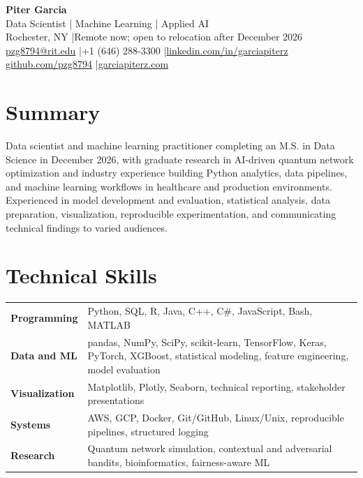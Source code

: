\documentclass[10pt,letterpaper]{article}
\begin{document}
\fontsize{9}{10.4}\selectfont

\begin{center}
  {\Large\bfseries Piter Garcia}\\[1pt]
  {\large Data Scientist | Machine Learning | Applied AI}\\[2pt]
  Rochester, NY \enspace|\enspace Remote now; open to relocation after December 2026\\
  \href{mailto:pzg8794@rit.edu}{pzg8794@rit.edu}
  \enspace|\enspace +1 (646) 288-3300
  \enspace|\enspace \href{https://linkedin.com/in/garciapiterz}{linkedin.com/in/garciapiterz}\\
  \href{https://github.com/pzg8794}{github.com/pzg8794}
  \enspace|\enspace \href{https://garciapiterz.com}{garciapiterz.com}
\end{center}

\section*{Summary}
Data scientist and machine learning practitioner completing an M.S. in Data
Science in December 2026, with graduate research in AI-driven quantum network
optimization and industry experience building Python analytics, data pipelines,
and machine learning workflows in healthcare and production environments.
Experienced in model development and evaluation, statistical analysis, data
preparation, visualization, reproducible experimentation, and communicating
technical findings to varied audiences.

\section*{Technical Skills}
\begin{tabularx}{\textwidth}{@{}>{\bfseries}l X@{}}
Programming & Python, SQL, R, Java, C++, C\#, JavaScript, Bash, MATLAB\\
Data and ML & pandas, NumPy, SciPy, scikit-learn, TensorFlow, Keras, PyTorch, XGBoost, statistical modeling, feature engineering, model evaluation\\
Visualization & Matplotlib, Plotly, Seaborn, technical reporting, stakeholder presentations\\
Systems & AWS, GCP, Docker, Git/GitHub, Linux/Unix, reproducible pipelines, structured logging\\
Research & Quantum network simulation, contextual and adversarial bandits, bioinformatics, fairness-aware ML\\
\end{tabularx}
\end{document}
